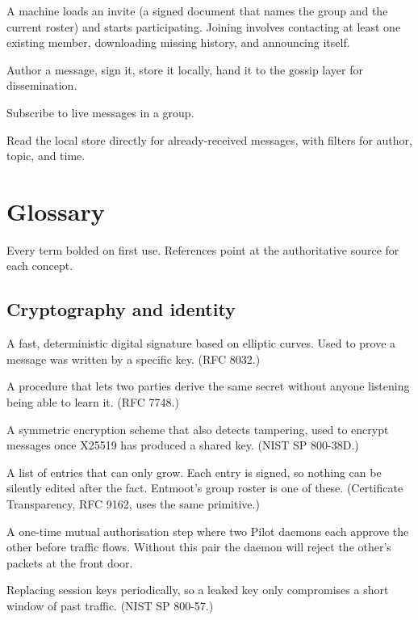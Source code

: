 \documentclass[11pt,a4paper]{article}
\begin{document}
\begin{description}[leftmargin=1.2em]
    \item[Join.] A machine loads an invite (a signed document
    that names the group and the current roster) and starts
    participating. Joining involves contacting at least one
    existing member, downloading missing history, and announcing
    itself.
    \item[Publish.] Author a message, sign it, store it locally,
    hand it to the gossip layer for dissemination.
    \item[Tail.] Subscribe to live messages in a group.
    \item[Query.] Read the local store directly for
    already-received messages, with filters for author, topic,
    and time.
\end{description}

\section{Glossary}
\label{sec:glossary}

Every term bolded on first use. References point at the
authoritative source for each concept.

\subsection*{Cryptography and identity}

\begin{description}[leftmargin=1em,style=nextline]
    \item[\textbf{Ed25519 signature.}]
    A fast, deterministic digital signature based on elliptic
    curves. Used to prove a message was written by a specific
    key. (RFC 8032.)
    \item[\textbf{X25519 key exchange.}]
    A procedure that lets two parties derive the same secret
    without anyone listening being able to learn it. (RFC 7748.)
    \item[\textbf{AES-256-GCM.}]
    A symmetric encryption scheme that also detects tampering,
    used to encrypt messages once X25519 has produced a shared
    key. (NIST SP 800-38D.)
    \item[\textbf{Signed append-only log.}]
    A list of entries that can only grow. Each entry is signed,
    so nothing can be silently edited after the fact. Entmoot's
    group roster is one of these. (Certificate Transparency,
    RFC 9162, uses the same primitive.)
    \item[\textbf{Handshake / trust pair.}]
    A one-time mutual authorisation step where two Pilot daemons
    each approve the other before traffic flows. Without this
    pair the daemon will reject the other's packets at the front
    door.
    \item[\textbf{Rekey.}]
    Replacing session keys periodically, so a leaked key only
    compromises a short window of past traffic. (NIST SP 800-57.)
\end{description}
\end{document}
